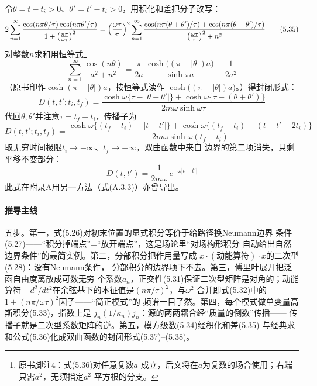 令$\theta=t-t_{i}>0$、$\theta'=t'-t_{i}>0$，用积化和差把分子改写：
\begin{equation*}
2\sum_{n=1}^{\infty}
\frac{\cos(n\pi\theta/\tau)\cos(n\pi\theta'/\tau)}
{1+\bigl(\frac{n\pi}{\omega\tau}\bigr)^{2}}
=\Bigl(\frac{\omega\tau}{\pi}\Bigr)^{2}\sum_{n=1}^{\infty}
\frac{\cos(n\pi(\theta+\theta')/\tau)+\cos(n\pi(\theta-\theta')/\tau)}
{\bigl(\frac{\omega\tau}{\pi}\bigr)^{2}+n^{2}}
\tag{5.35}
\end{equation*}
对整数$n$求和用恒等式\footnote{原书脚注4：式(5.36)对任意复数$a$
成立，后文将在$a$为复数的场合使用；右端只需$a^{2}$，无须指定$a^{2}$
平方根的分支。}
\begin{equation*}
\sum_{n=1}^{\infty}\frac{\cos(n\theta)}{a^{2}+n^{2}}
=\frac{\pi}{2a}\,\frac{\cosh\bigl((\pi-|\theta|)a\bigr)}{\sinh\pi a}
-\frac{1}{2a^{2}}
\tag{5.36}
\end{equation*}
（原书印作$\cosh(\pi-|\theta|)a$，按恒等式读作
$\cosh\bigl((\pi-|\theta|)a\bigr)$。）得封闭形式：
\begin{equation*}
D(t,t';t_{i},t_{f})
=\frac{\cosh\omega\{\tau-|\theta-\theta'|\}
+\cosh\omega\{\tau-(\theta+\theta')\}}
{2m\omega\sinh\omega\tau}
\tag{5.37}
\end{equation*}
代回$\theta,\theta'$并注意$\tau=t_{f}-t_{i}$，传播子为
\begin{equation*}
D(t,t';t_{i},t_{f})=
\frac{\cosh\omega\{(t_{f}-t_{i})-|t-t'|\}
+\cosh\omega\{(t_{f}-t_{i})-(t+t'-2t_{i})\}}
{2m\omega\sinh\omega(t_{f}-t_{i})}
\tag{5.38}
\end{equation*}
取无穷时间极限$t_{i}\to-\infty$、$t_{f}\to+\infty$，双曲函数中来自
边界的第二项消失，只剩平移不变部分：
\begin{equation*}
D(t,t')=\frac{1}{2m\omega}\,e^{-\omega|t-t'|}
\tag{5.39}
\end{equation*}
此式在附录A用另一方法（式(A.3.3)）亦曾导出。

\paragraph{推导主线}
五步。第一，式(5.26)对初末位置的显式积分等价于给路径换Neumann边界
条件(5.27)——“积分掉端点”=“放开端点”，这是场论里“对场构形积分
自动给出自然边界条件”的最简实例。第二，分部积分把作用量写成
$x\cdot(\text{动能算符})\cdot x$的二次型(5.28)：没有Neumann条件，
分部积分的边界项下不去。第三，傅里叶展开把泛函自由度离散成可数无穷
个系数$a_{n}$，正交性(5.31)保证二次型矩阵是对角的；动能算符
$-d^{2}/dt^{2}$在余弦基下的本征值是$(n\pi/\tau)^{2}$，与$\omega^{2}$
合并即式(5.32)中的$1+(n\pi/\omega\tau)^{2}$因子——“简正模式”的
频谱一目了然。第四，每个模式做单变量高斯积分(5.33)，指数上是
$j_{n}(1/\kappa_{n})j_{n}$：源的两两耦合经“质量的倒数”传播——
传播子就是二次型系数矩阵的逆。第五，模方级数(5.34)经积化和差(5.35)
与经典求和公式(5.36)化成双曲函数的封闭形式(5.37)--(5.38)。

